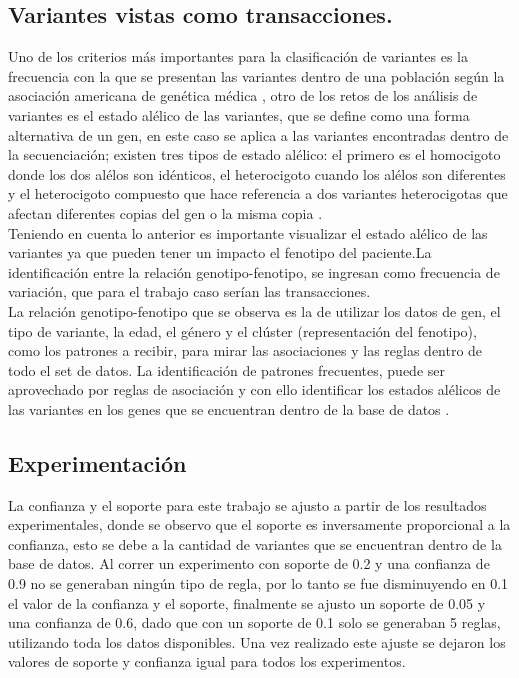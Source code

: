 \subsection{Variantes vistas como transacciones.}

Uno de los criterios más importantes para la clasificación de variantes es la frecuencia con la que se presentan las variantes dentro de una población según la asociación americana de genética médica \cite{Laboratories2015}, otro de los retos de los análisis de variantes es el estado alélico de las variantes, que se define como una forma alternativa de un gen, en este caso se aplica a las variantes encontradas dentro de la secuenciación; existen tres tipos de estado alélico: el primero es el homocigoto donde los dos alélos son idénticos, el heterocigoto cuando los alélos son diferentes y el heterocigoto compuesto que hace referencia a dos variantes heterocigotas que afectan diferentes copias del gen o la misma copia \cite{Klug2013,Compound2012}.\\

Teniendo en cuenta lo anterior es importante visualizar el estado alélico de las variantes \cite{Hannah-Shmouni2015,Laboratories2015} ya que pueden tener un impacto el fenotipo del paciente.La identificación entre la relación genotipo-fenotipo, se ingresan como frecuencia de variación, que para el trabajo caso serían las transacciones\cite{Breuer2017}.\\

La relación genotipo-fenotipo que se observa es  la de utilizar los datos de gen, el tipo de variante, la edad, el género y el clúster (representación del fenotipo), como los patrones a recibir, para mirar las asociaciones y las reglas dentro de todo el set de datos. La identificación de patrones frecuentes, puede ser aprovechado por reglas de asociación y con ello identificar los estados alélicos de las variantes en los genes que se encuentran dentro de la base de datos \cite{breuler2017}.\\

\subsection{Experimentación}

La confianza y el soporte para este trabajo se ajusto a partir de los resultados experimentales, donde se observo que el soporte es inversamente proporcional a la confianza, esto se debe a la cantidad de variantes que se encuentran dentro de la base de datos. Al correr un experimento con soporte de 0.2 y una confianza de 0.9 no se generaban ningún tipo de regla, por lo tanto se fue disminuyendo en 0.1 el valor de la confianza y el soporte, finalmente se ajusto un soporte de 0.05 y una confianza de 0.6, dado que con un soporte de 0.1 solo se generaban 5 reglas, utilizando toda los datos disponibles. Una vez realizado este ajuste se dejaron los valores de soporte y confianza igual para todos los experimentos.\\

